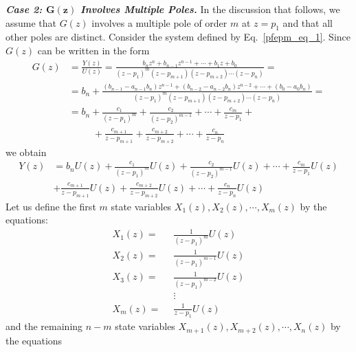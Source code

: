 \documentclass[12pt,a4paper,oneside]{book}
\begin{document}
\begin{onehalfspace}
\vspace{5mm}
\noindent\textbf{\textit{Case 2: $\mathbf{G(z)}$ Involves Multiple Poles.}}
In the discussion that follows, we assume that $G(z)$ involves a multiple pole of order $m$ at $z=p_1$ and that all other poles are distinct.
Consider the system defined by Eq.~\eqref{pfepm_eq_1}. Since $G(z)$ can be 
written in the form 
\begin{equation}\label{pfepm_eq_12}
	\begin{aligned}
		G(z)&=\frac{Y(z)}{U(z)} = \frac{b_nz^n+b_{n-1}z^{n-1}+ \cdots +b_1z+b_0}{(z-p_1)^m(z-p_{m+1})(z-p_{m+2})\cdots(z-p_n)} = \\[8pt]
		&= b_n+\frac{(b_{n-1}-a_{n-1}b_n)z^{n-1}+(b_{n-2}-a_{n-2}b_n)z^{n-2}+\cdots+(b_0-a_0b_n)}{(z-p_1)^m(z-p_{m+1})(z-p_{m+2})\cdots(z-p_n)} = \\[8pt]
		&= b_n + \frac{c_1}{(z-p_1)^m}+\frac{c_2}{(z-p_2)^{m-1}}+\cdots+\frac{c_m}{z-p_1}+ \\[8pt]
		& \quad \quad \enspace + \frac{c_{m+1}}{z-p_{m+1}} +\frac{c_{m+2}}{z-p_{m+2}}+\cdots+\frac{c_{n}}{z-p_{n}}
	\end{aligned}
\end{equation}
we obtain 
\begin{equation}\label{pfepm_eq_13}
	\begin{aligned}
		Y(z) &= b_n U(z) + \frac{c_{1}}{(z-p_{1})^m}U(z)+\frac{c_{2}}{(z-p_{2})^{m-1}}U(z)+\cdots+\frac{c_m}{z-p_1}U(z) \\[6pt] 
		& +\frac{c_{m+1}}{z-p_{m+1}}U(z) +\frac{c_{m+2}}{z-p_{m+2}}U(z) + \cdots +\frac{c_{n}}{z-p_{n}}U(z)
	\end{aligned}
\end{equation}
Let us define the first $m$ state variables $X_1(z), X_2(z),\cdots,X_m(z)$ by the equations:
\begin{equation}\label{pfepm_eq_14}
	\begin{aligned}
		X_1(z)= & \enspace  \frac{1}{(z-p_1)^m}U(z) \\[6pt]
		X_2(z)= & \enspace  \frac{1}{(z-p_1)^{m-1}}U(z) \\[6pt]
		X_3(z)= & \enspace  \frac{1}{(z-p_1)^{m-2}}U(z) \\[6pt]
		& \enspace \vdots \\[6pt]
		X_m(z)= & \enspace  \frac{1}{z-p_1}U(z) 
	\end{aligned}
\end{equation}
and the remaining $n-m$ state variables $X_{m+1}(z),X_{m+2}(z),\cdots,X_n(z)$ by the equations
\begin{equation}\label{pfepm_eq_15}

\end{equation}
\end{onehalfspace}
\end{document}
